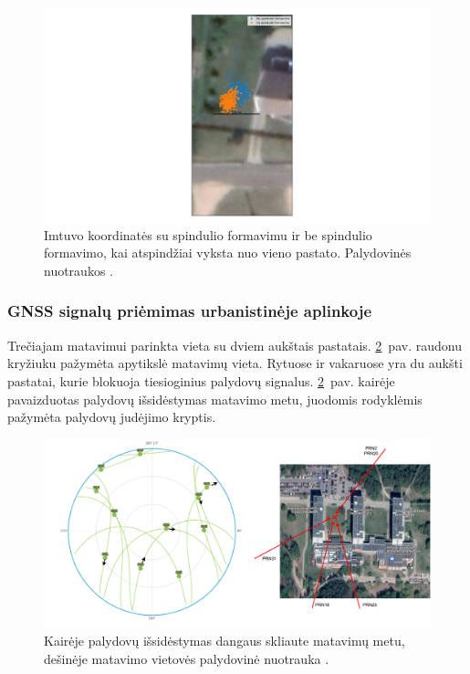 \documentclass[main.tex]{subfiles}
\begin{document}
\begin{figure}[ht]
    \begin{centering}
    \hspace*{-4cm}\includegraphics[scale=0.5]{drawings/one_reflection_map}
    \par\end{centering}
    \protect\caption{\label{fig:single_reflection_map}Imtuvo koordinatės su spindulio formavimu ir be spindulio formavimo, kai atspindžiai vyksta nuo vieno pastato. Palydovinės nuotraukos \cite{google_maps}.}
\end{figure}

\subsubsection{GNSS signalų priėmimas urbanistinėje aplinkoje}\label{sec:gnss_meas_two_reflection}

Trečiajam matavimui parinkta vieta su dviem aukštais pastatais.
\ref{fig:two_reflection_sat_pos}~pav. raudonu kryžiuku pažymėta apytikslė matavimų
vieta. Rytuose ir vakaruose yra du aukšti pastatai, kurie blokuoja tiesioginius palydovų signalus. 
\ref{fig:two_reflection_sat_pos}~pav. kairėje pavaizduotas palydovų išsidėstymas
matavimo metu, juodomis rodyklėmis pažymėta palydovų judėjimo kryptis.

\begin{figure}[ht]
    \begin{centering}
    \includegraphics[scale=0.4]{drawings/vu_sats_map.drawio}
    \par\end{centering}
    \protect\caption{\label{fig:two_reflection_sat_pos}Kairėje palydovų išsidėstymas dangaus skliaute matavimų metu, dešinėje matavimo vietovės palydovinė nuotrauka \cite{google_maps}.}
\end{figure}
\end{document}
